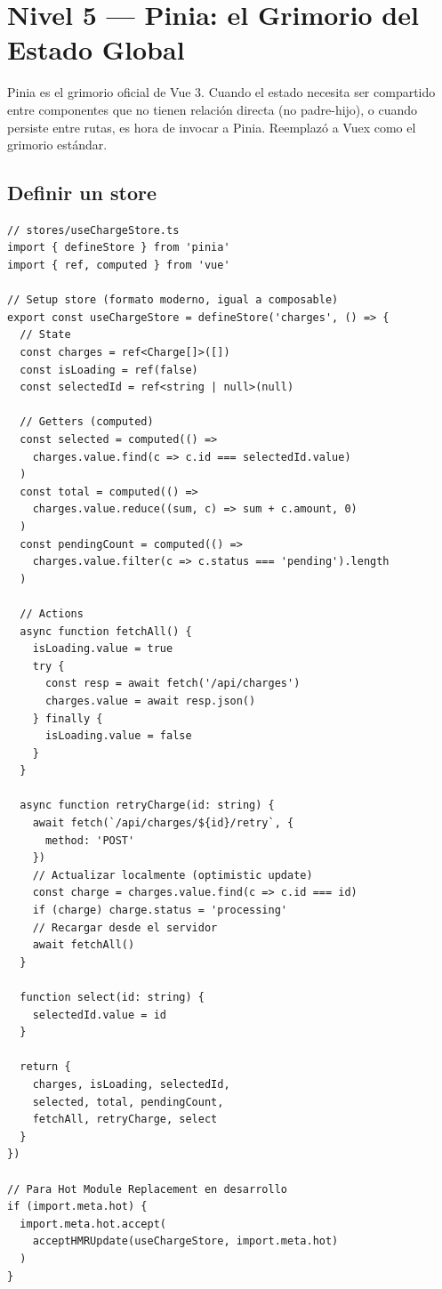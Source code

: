 \documentclass[11pt,a4paper]{article}
\begin{document}
\section{Nivel 5 — Pinia: el Grimorio del Estado Global}

\begin{lore}
Pinia es el grimorio oficial de Vue 3. Cuando el estado necesita
ser compartido entre componentes que no tienen relación directa
(no padre-hijo), o cuando persiste entre rutas, es hora de
invocar a Pinia. Reemplazó a Vuex como el grimorio estándar.
\end{lore}

\subsection{Definir un store}

\begin{pergamino}
\begin{lstlisting}[style=vue]
// stores/useChargeStore.ts
import { defineStore } from 'pinia'
import { ref, computed } from 'vue'

// Setup store (formato moderno, igual a composable)
export const useChargeStore = defineStore('charges', () => {
  // State
  const charges = ref<Charge[]>([])
  const isLoading = ref(false)
  const selectedId = ref<string | null>(null)

  // Getters (computed)
  const selected = computed(() =>
    charges.value.find(c => c.id === selectedId.value)
  )
  const total = computed(() =>
    charges.value.reduce((sum, c) => sum + c.amount, 0)
  )
  const pendingCount = computed(() =>
    charges.value.filter(c => c.status === 'pending').length
  )

  // Actions
  async function fetchAll() {
    isLoading.value = true
    try {
      const resp = await fetch('/api/charges')
      charges.value = await resp.json()
    } finally {
      isLoading.value = false
    }
  }

  async function retryCharge(id: string) {
    await fetch(`/api/charges/${id}/retry`, {
      method: 'POST'
    })
    // Actualizar localmente (optimistic update)
    const charge = charges.value.find(c => c.id === id)
    if (charge) charge.status = 'processing'
    // Recargar desde el servidor
    await fetchAll()
  }

  function select(id: string) {
    selectedId.value = id
  }

  return {
    charges, isLoading, selectedId,
    selected, total, pendingCount,
    fetchAll, retryCharge, select
  }
})

// Para Hot Module Replacement en desarrollo
if (import.meta.hot) {
  import.meta.hot.accept(
    acceptHMRUpdate(useChargeStore, import.meta.hot)
  )
}
\end{lstlisting}
\end{pergamino}
\end{document}
